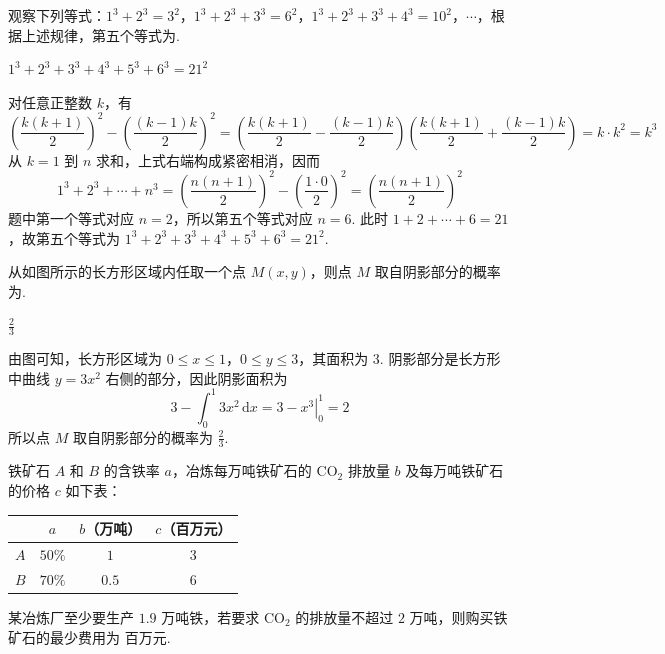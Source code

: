 \begin{problem}
观察下列等式：\(1^3 + 2^3 = 3^2\)，\(1^3 + 2^3 + 3^3 = 6^2\)，\(1^3 + 2^3 + 3^3 + 4^3 = 10^2\)，\(\cdots\)，根据上述规律，第五个等式为\fillinblank{}.
\end{problem}

\begin{answer}
\(1^3 + 2^3 + 3^3 + 4^3 + 5^3 + 6^3 = 21^2\)
\end{answer}

\begin{solution}
对任意正整数 \(k\)，有
\[
\left(\frac{k(k+1)}2\right)^2-\left(\frac{(k-1)k}2\right)^2
=\left(\frac{k(k+1)}2-\frac{(k-1)k}2\right)
\left(\frac{k(k+1)}2+\frac{(k-1)k}2\right)=k\cdot k^2=k^3
\]
从 \(k=1\) 到 \(n\) 求和，上式右端构成紧密相消，因而
\[
1^3+2^3+\cdots+n^3
=\left(\frac{n(n+1)}2\right)^2-\left(\frac{1\cdot0}2\right)^2
=\left(\frac{n(n+1)}2\right)^2
\]
题中第一个等式对应 \(n=2\)，所以第五个等式对应 \(n=6\). 此时 \(1+2+\cdots+6=21\)，故第五个等式为 \(1^3+2^3+3^3+4^3+5^3+6^3=21^2\).
\end{solution}

\begin{problem}
从如图所示的长方形区域内任取一个点 \(M(x, y)\)，则点 \(M\) 取自阴影部分的概率为\fillinblank{}.

\end{problem}

\begin{answer}
\(\frac{2}{3}\)
\end{answer}

\begin{solution}
由图可知，长方形区域为 \(0\leqslant x\leqslant 1\)，\(0\leqslant y\leqslant 3\)，其面积为 \(3\). 阴影部分是长方形中曲线 \(y=3x^2\) 右侧的部分，因此阴影面积为
\[
3-\int_0^1 3x^2\,\mathrm{d}x=3-\left.x^3\right|_0^1=2
\]
所以点 \(M\) 取自阴影部分的概率为 \(\frac{2}{3}\).
\end{solution}

\begin{problem}
铁矿石 \(A\) 和 \(B\) 的含铁率 \(a\)，冶炼每万吨铁矿石的 \(\mathrm{CO}_2\) 排放量 \(b\) 及每万吨铁矿石的价格 \(c\) 如下表：

\begin{center}
\begin{tabular}{|c|c|c|c|}
\hline
 & \(a\) & \(b\)（万吨） & \(c\)（百万元） \\
\hline
\(A\) & \(50\%\) & \(1\) & \(3\) \\
\hline
\(B\) & \(70\%\) & \(0.5\) & \(6\) \\
\hline
\end{tabular}
\end{center}

某冶炼厂至少要生产 \(1.9\) 万吨铁，若要求 \(\mathrm{CO}_2\) 的排放量不超过 \(2\) 万吨，则购买铁矿石的最少费用为\fillinblank{} 百万元.
\end{problem}

